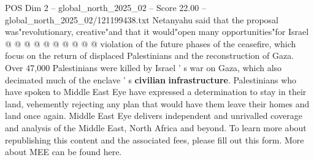 \begin{textsample}{POS Dim 2 – global\_north\_2025\_02 – Score 22.00 – global\_north\_2025\_02/121199438.txt}
Netanyahu said that the proposal was"revolutionary, creative"and that it would"open many opportunities"for Israel @ @ @ @ @ @ @ @ @ @ violation of the future phases of the ceasefire, which focus on the return of displaced Palestinians and the reconstruction of Gaza.
Over 47,000 Palestinians were killed by Israel ' s war on Gaza, which also decimated much of the enclave ' s \textbf{civilian} \textbf{infrastructure}.
Palestinians who have spoken to Middle East Eye have expressed a determination to stay in their land, vehemently rejecting any plan that would have them leave their homes and land once again.
Middle East Eye delivers independent and unrivalled coverage and analysis of the Middle East, North Africa and beyond.
To learn more about republishing this content and the associated fees, please fill out this form.
More about MEE can be found here.

\end{textsample}
